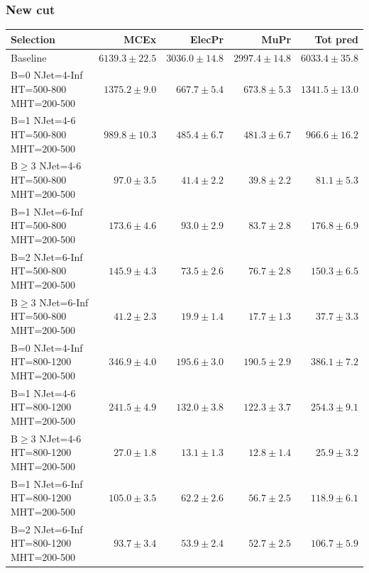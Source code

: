\documentclass{beamer}
\begin{document}
\begin{frame}
\frametitle{New \mindeltaphi cut}
\tiny
 \begin{tabular}{lrrrr}
\toprule
                                       Selection  &                     MCEx  &           ElecPr  &             MuPr  &          Tot pred  \\ 
\midrule
                                        Baseline &           $6139.3\pm22.5$&           $3036.0\pm14.8$&           $2997.4\pm14.8$&               $6033.4\pm35.8$ \\ 
    B=0 NJet=4-Inf HT=500-800 MHT=200-500 &            $1375.2\pm9.0$&             $667.7\pm5.4$&             $673.8\pm5.3$&               $1341.5\pm13.0$ \\ 
      B=1 NJet=4-6 HT=500-800 MHT=200-500 &            $989.8\pm10.3$&             $485.4\pm6.7$&             $481.3\pm6.7$&                $966.6\pm16.2$ \\ 
      $\text{B}\geq3$ NJet=4-6 HT=500-800 MHT=200-500 &              $97.0\pm3.5$&              $41.4\pm2.2$&              $39.8\pm2.2$&                  $81.1\pm5.3$ \\ 
    B=1 NJet=6-Inf HT=500-800 MHT=200-500 &             $173.6\pm4.6$&              $93.0\pm2.9$&              $83.7\pm2.8$&                 $176.8\pm6.9$ \\ 
    B=2 NJet=6-Inf HT=500-800 MHT=200-500 &             $145.9\pm4.3$&              $73.5\pm2.6$&              $76.7\pm2.8$&                 $150.3\pm6.5$ \\ 
    $\text{B}\geq3$ NJet=6-Inf HT=500-800 MHT=200-500 &              $41.2\pm2.3$&              $19.9\pm1.4$&              $17.7\pm1.3$&                  $37.7\pm3.3$ \\ 
   B=0 NJet=4-Inf HT=800-1200 MHT=200-500 &             $346.9\pm4.0$&             $195.6\pm3.0$&             $190.5\pm2.9$&                 $386.1\pm7.2$ \\ 
     B=1 NJet=4-6 HT=800-1200 MHT=200-500 &             $241.5\pm4.9$&             $132.0\pm3.8$&             $122.3\pm3.7$&                 $254.3\pm9.1$ \\ 
     $\text{B}\geq3$ NJet=4-6 HT=800-1200 MHT=200-500 &              $27.0\pm1.8$&              $13.1\pm1.3$&              $12.8\pm1.4$&                  $25.9\pm3.2$ \\ 
   B=1 NJet=6-Inf HT=800-1200 MHT=200-500 &             $105.0\pm3.5$&              $62.2\pm2.6$&              $56.7\pm2.5$&                 $118.9\pm6.1$ \\ 
   B=2 NJet=6-Inf HT=800-1200 MHT=200-500 &              $93.7\pm3.4$&              $53.9\pm2.4$&              $52.7\pm2.5$&                 $106.7\pm5.9$ \\ 

\end{tabular}
\end{frame}
\end{document}

